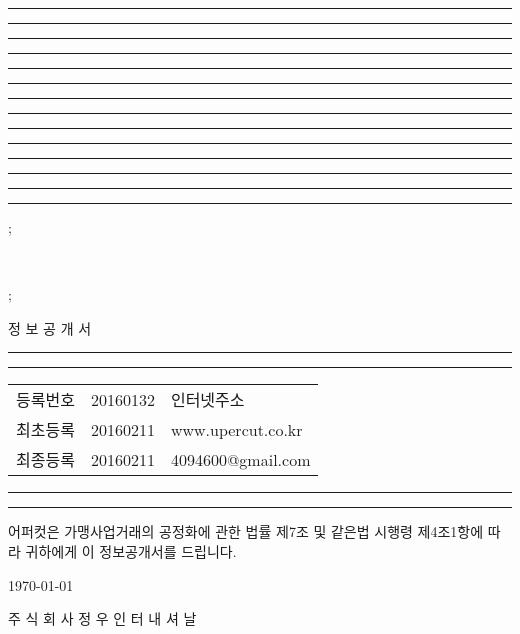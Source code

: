 \documentclass[a5paper,10pt]{oblivoir}
\date{}
\newcommand\crule[3][black]{\textcolor{#1}{\rule{#2}{#3}}}
\begin{document}
\newpage
\thispagestyle{empty}
\begin{center}
\rule{3cm}{0cm}
\crule[red]{0.1cm}{5cm}
\rule{0.09cm}{0cm}\crule[blue!60!white!100]{0.1cm}{5cm}
\rule{0.09cm}{0cm}\crule[red]{0.1cm}{5cm}
\rule{0.09cm}{0cm}\crule[blue!60!white!100]{0.1cm}{5cm}
\rule{0.09cm}{0cm}\crule[red]{0.1cm}{5cm}
\rule{0.09cm}{0cm}\crule[blue!60!white!100]{0.1cm}{5cm}
\rule{0.09cm}{0cm}\crule[red]{0.1cm}{5cm}

\noindent
\begin{tikzfadingfrompicture}[name=tikz]
;
\end{tikzfadingfrompicture}
\\
\noindent
\begin{tikzfadingfrompicture}[name=tikz]
;
\end{tikzfadingfrompicture}
\end{center}

\begin{center}
 \large  정 보 공 개 서

\crule[red]{4cm}{0.1cm} \crule[blue]{4cm}{0.1cm}
\end{center}

\begin{tabu}{XX[c]X}
등록번호&20160132& 인터넷주소\\
최초등록&20160211&www.upercut.co.kr\\
최종등록&20160211&4094600@gmail.com\\
\end{tabu}
\newpage
\begin{center}
\crule[red]{4cm}{0.1cm} \crule[blue]{4cm}{0.1cm}
\end{center}

 어퍼컷은 가맹사업거래의 공정화에 관한 법률 제7조  및 같은법 시행령 제4조1항에  따라 귀하에게 이 정보공개서를 드립니다.
\begin{center} \today

\rule{0cm}{0.5cm}

  주 식  회 사 정 우 인 터 내 셔 날

 \end{center}
\end{document}
